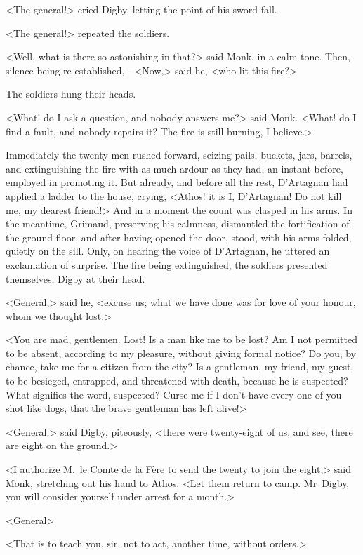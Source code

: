 <The general!> cried Digby, letting the point of his sword fall.

<The general!> repeated the soldiers.

<Well, what is there so astonishing in that?> said Monk, in a calm tone. Then, silence being re-established,—<Now,> said he, <who lit this fire?>

The soldiers hung their heads.

<What! do I ask a question, and nobody answers me?> said Monk. <What! do I find a fault, and nobody repairs it? The fire is still burning, I believe.>

Immediately the twenty men rushed forward, seizing pails, buckets, jars, barrels, and extinguishing the fire with as much ardour as they had, an instant before, employed in promoting it. But already, and before all the rest, D'Artagnan had applied a ladder to the house, crying, <Athos! it is I, D'Artagnan! Do not kill me, my dearest friend!> And in a moment the count was clasped in his arms. In the meantime, Grimaud, preserving his calmness, dismantled the fortification of the ground-floor, and after having opened the door, stood, with his arms folded, quietly on the sill. Only, on hearing the voice of D'Artagnan, he uttered an exclamation of surprise. The fire being extinguished, the soldiers presented themselves, Digby at their head.

<General,> said he, <excuse us; what we have done was for love of your honour, whom we thought lost.>

<You are mad, gentlemen. Lost! Is a man like me to be lost? Am I not permitted to be absent, according to my pleasure, without giving formal notice? Do you, by chance, take me for a citizen from the city? Is a gentleman, my friend, my guest, to be besieged, entrapped, and threatened with death, because he is suspected? What signifies the word, suspected? Curse me if I don't have every one of you shot like dogs, that the brave gentleman has left alive!>

<General,> said Digby, piteously, <there were twenty-eight of us, and see, there are eight on the ground.>

<I authorize M.~le Comte de la Fère to send the twenty to join the eight,> said Monk, stretching out his hand to Athos. <Let them return to camp. Mr~Digby, you will consider yourself under arrest for a month.>

<General\longdash>

<That is to teach you, sir, not to act, another time, without orders.>

